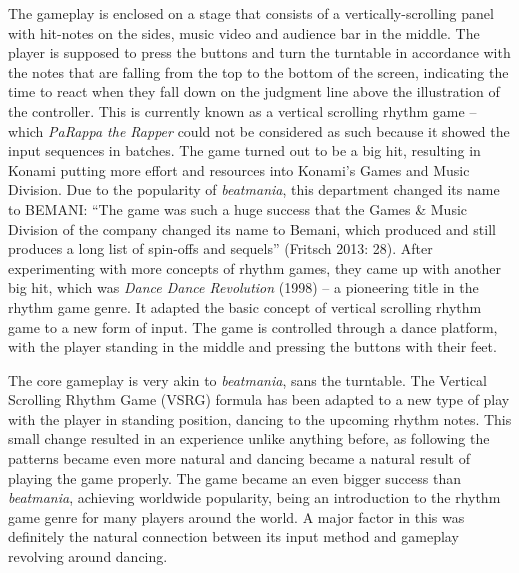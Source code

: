 The gameplay is enclosed on a stage that consists of a vertically-scrolling panel with hit-notes on the sides, music video and audience bar in the middle. The player is supposed to press the buttons and turn the turntable in accordance with the notes that are falling from the top to the bottom of the screen, indicating the time to react when they fall down on the judgment line above the illustration of the controller. This is currently known as a vertical scrolling rhythm game -- which \textit{PaRappa the Rapper} could not be considered as such because it showed the input sequences in batches. The game turned out to be a big hit, resulting in Konami putting more effort and resources into Konami’s Games and Music Division. Due to the popularity of \textit{beatmania}, this department changed its name to BEMANI: ``The game was such a huge success that the Games \& Music Division
of the company changed its name to Bemani, which produced and still produces a
long list of spin-offs and sequels'' (Fritsch 2013: 28). \cite{MusicMedien} After experimenting with more concepts of rhythm games, they came up with another big hit, which was \textit{Dance Dance Revolution} (1998) -- a pioneering title in the rhythm game genre. It adapted the basic concept of vertical scrolling rhythm game to a new form of input. The game is controlled through a dance platform, with the player standing in the middle and pressing the buttons with their feet.

The core gameplay is very akin to \textit{beatmania}, sans the turntable. The Vertical Scrolling Rhythm Game (VSRG) formula has been adapted to a new type of play with the player in standing position, dancing to the upcoming rhythm notes. This small change resulted in an experience unlike anything before, as following the patterns became even more natural and dancing became a natural result of playing the game properly. The game became an even bigger success than \textit{beatmania}, achieving worldwide popularity, being an introduction to the rhythm game genre for many players around the world. A major factor in this was definitely the natural connection between its input method and gameplay revolving around dancing.

